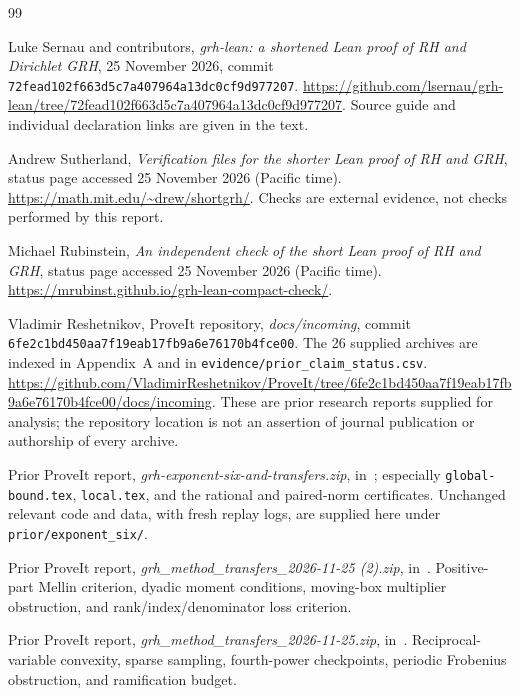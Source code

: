 \begin{thebibliography}{99}

Luke Sernau and contributors,
\emph{grh-lean: a shortened Lean proof of RH and Dirichlet GRH},
25 November 2026, commit
\texttt{72fead102f663d5c7a407964a13dc0cf9d977207}.
\url{https://github.com/lsernau/grh-lean/tree/72fead102f663d5c7a407964a13dc0cf9d977207}.
Source guide and individual declaration links are given in the text.

Andrew Sutherland,
\emph{Verification files for the shorter Lean proof of RH and GRH},
status page accessed 25 November 2026 (Pacific time).
\url{https://math.mit.edu/~drew/shortgrh/}.
Checks are external evidence, not checks performed by this report.

Michael Rubinstein,
\emph{An independent check of the short Lean proof of RH and GRH},
status page accessed 25 November 2026 (Pacific time).
\url{https://mrubinst.github.io/grh-lean-compact-check/}.

Vladimir Reshetnikov, ProveIt repository, \emph{docs/incoming},
commit \texttt{6fe2c1bd450aa7f19eab17fb9a6e76170b4fce00}.
The 26 supplied archives are indexed in Appendix~A and in
\texttt{evidence/prior\_claim\_status.csv}.
\url{https://github.com/VladimirReshetnikov/ProveIt/tree/6fe2c1bd450aa7f19eab17fb9a6e76170b4fce00/docs/incoming}.
These are prior research reports supplied for analysis; the repository location is not an assertion of journal publication or authorship of every archive.

Prior ProveIt report,
\emph{grh-exponent-six-and-transfers.zip},
in~\cite{priorCollection}; especially \texttt{global-bound.tex},
\texttt{local.tex}, and the rational and paired-norm certificates.
Unchanged relevant code and data, with fresh replay logs, are supplied here under
\texttt{prior/exponent\_six/}.

Prior ProveIt report,
\emph{grh\_method\_transfers\_2026-11-25 (2).zip},
in~\cite{priorCollection}.
Positive-part Mellin criterion, dyadic moment conditions, moving-box multiplier obstruction, and rank/index/denominator loss criterion.

Prior ProveIt report,
\emph{grh\_method\_transfers\_2026-11-25.zip},
in~\cite{priorCollection}.
Reciprocal-variable convexity, sparse sampling, fourth-power checkpoints, periodic Frobenius obstruction, and ramification budget.


\end{thebibliography}
